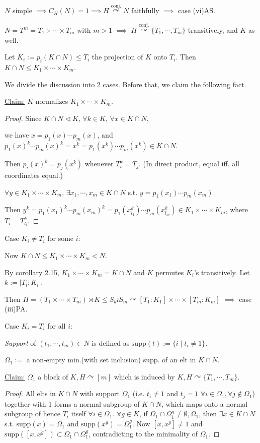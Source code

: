 \documentclass[a4paper,11pt]{article}
\begin{document}
$N$ simple $\implies C_H(N)=1\implies H\mathop{\curvearrowright}\limits^{\text{conj.}} N$ faithfully $\implies$ case (vi)AS.

$N=T^m=T_1\times\cdots\times T_m$ with $m>1$ $\implies$ $H\mathop{\curvearrowright}\limits^{\text{conj.}} \{T_1,\cdots,T_m\}$ transitively, and $K$ as well.

Let $K_i:=p_i(K\cap N)\leq T_i$ the projection of $K$ onto $T_i$. Then $K\cap N\leq K_1\times\cdots\times K_m$.

We divide the discussion into 2 cases. Before that, we claim the following fact.

\noindent\underline{Claim:} $K$ normalizes $K_1\times\cdots\times K_m$. 
{\color{gray}
\begin{proof}
    Since $K\cap N\triangleleft K$, $\forall k\in K$, $\forall x\in K\cap N$, 
    
    we have $x=p_1(x)\cdots p_m(x)$, and $p_1(x)^k\cdots p_m(x)^k=x^k=p_1(x^k)\cdots p_m(x^k)\in K\cap N$. 
    
    Then $p_i(x)^k=p_j(x^k)$ whenever $T_i^k=T_j$. (In direct product, equal iff. all coordinates equal.)
    
    $\forall y \in K_1\times\cdots\times K_m$, $\exists x_1,\cdots, x_m\in K\cap N$ s.t. $y=p_1(x_1)\cdots p_m(x_m)$. 
    
    Then $y^k=p_1(x_1)^k\cdots p_m(x_m)^k=p_1(x_{l_1}^k)\cdots p_m(x_{l_m}^k) \in K_1\times\cdots\times K_m$, where $T_i=T_{l_i}^k$.
\end{proof}
}

\noindent Case $K_i\neq T_i$ for some $i$: 

Now $K\cap N\leq K_1\times\cdots\times K_m < N$.

By corollary 2.15, $K_1\times\cdots\times K_m=K\cap N$ and $K$ permutes $K_i$'s transitively. Let $k:=|T_i:K_i|$. 

Then $H=(T_1\times\cdots\times  T_m)\rtimes K\leq S_k\wr S_m\curvearrowright [T_1:K_1]\times\cdots\times[T_m:K_m]$ $\implies$ case (iii)PA.

\noindent Case $K_i= T_i$ for all $i$: 

\textit{Support} of $(t_1,\cdots,t_m)\in N$ is defined as $\mathrm{supp}(t):=\{i\mid t_i\neq 1\}$.


$\Omega_1:=$ a non-empty min.(with set inclusion) supp. of an elt in $K\cap N$. 

\underline{Claim:} $\Omega_1$ a block of $K,H\curvearrowright [m]$ which is induced by $K,H\curvearrowright \{T_1,\cdots,T_m\}$.
{\color{gray}
\begin{proof}
    All elts in $K\cap N$ with support $\Omega_1$ (i.e. $t_i\neq 1$ and $t_j=1$ $\forall i\in\Omega_1, \forall j\notin\Omega_1$) together with 1 forms a normal subgroup of $K\cap N$, which maps onto a normal subgroup of hence $T_i$ itself $\forall i\in\Omega_1$.
    $\forall g\in K$, if $\Omega_1\cap \Omega_1^g\neq \emptyset,\Omega_1$, then $ \exists x\in K\cap N$ s.t. $ \mathrm{supp}(x)=\Omega_1$ and $\mathrm{supp}(x^g)=\Omega_1^g$. Now $[x,x^g]\neq 1$ and $\mathrm{supp}([x,x^g])\subset\Omega_1\cap \Omega_1^g$, contradicting to the minimality of $\Omega_1$.
\end{proof}
}
\end{document}
